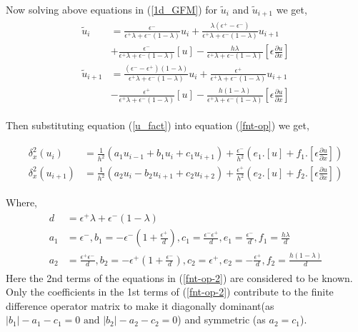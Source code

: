 Now solving above equations in (\ref{1d_GFM})  for $\tilde{u}_i $ and $\tilde{u}_{i+1}$ we get, 
\begin{eqnarray}
\begin{aligned}
	\tilde{u}_i&= \frac{\epsilon^-}{\epsilon^+\lambda+\epsilon^-(1-\lambda)}u_i +\frac{\lambda(\epsilon^+-\epsilon^-)}{\epsilon^+\lambda+\epsilon^-(1-\lambda)}u_{i+1}\\ &+\frac{\epsilon^-}{\epsilon^+\lambda+\epsilon^-(1-\lambda)}\left[u\right] -\frac{h \lambda}{\epsilon^+\lambda+\epsilon^-(1-\lambda)}\left[ \epsilon \frac{\partial u}{\partial x} \right]\\
	\tilde{u}_{i+1}&= \frac{(\epsilon^--\epsilon^+)(1-\lambda)}{\epsilon^+\lambda+\epsilon^-(1-\lambda)} u_i +\frac{\epsilon^+}{\epsilon^+\lambda+\epsilon^-(1-\lambda)} u_{i+1} \\
	& -\frac{\epsilon^+}{\epsilon^+\lambda+\epsilon^-(1-\lambda)} \left[u\right] -\frac{h(1-\lambda)}{\epsilon^+\lambda+\epsilon^-(1-\lambda)}\left[ \epsilon \frac{\partial u}{\partial x} \right]\label{u_fact}
\end{aligned}
\end{eqnarray}

Then substituting equation (\ref{u_fact}) into equation (\ref{fnt-op}) we get, 

\begin{eqnarray}
	\begin{aligned}
		\delta_x^2\left(u_{i}\right)&= \frac{1}{h^2} \left(a_1u_{i-1}+b_1 u_{i}+c_1u_{i+1}\right)+\frac{\epsilon^-}{h^2}\left(e_1.[u]+f_1.\left[ \epsilon \frac{\partial u}{\partial x} \right]\right)\\
		\delta_x^2\left(u_{i+1}\right)&= \frac{1}{h^2} \left(a_2u_{i}-b_2u_{i+1}+c_2u_{i+2}\right)+\frac{\epsilon^+}{h^2}\left(e_2.[u]+f_2.\left[ \epsilon \frac{\partial u}{\partial x} \right]\right)
	\end{aligned}\label{fnt-op-2}
\end{eqnarray}
 
Where,
\begin{eqnarray}
\begin{aligned}
d&=\epsilon^+\lambda+\epsilon^-(1-\lambda)\\
a_1&= \epsilon^-,b_1=-\epsilon^-\left(1+\frac{\epsilon^+}{d}\right), c_1=\frac{\epsilon^-\epsilon^+}{d}, e_1=\frac{\epsilon^-}{d},f_1=\frac{h\lambda}{d}\\
a_2&= \frac{\epsilon^+\epsilon^-}{d},b_2=-\epsilon^+\left(1+\frac{\epsilon^-}{d}\right), c_2=\epsilon^+, e_2=-\frac{\epsilon^+}{d},f_2=\frac{h(1-\lambda)}{d}
\end{aligned}
\end{eqnarray}
Here the 2nd terms of the equations in (\ref{fnt-op-2}) are considered to be known. Only the coefficients in the 1st terms of (\ref{fnt-op-2})  contribute to the finite difference operator matrix to make it diagonally dominant(as $|b_1|-a_1-c_1=0\text{ and } |b_2|-a_2-c_2=0$) and symmetric (as $a_2=c_1$).  

